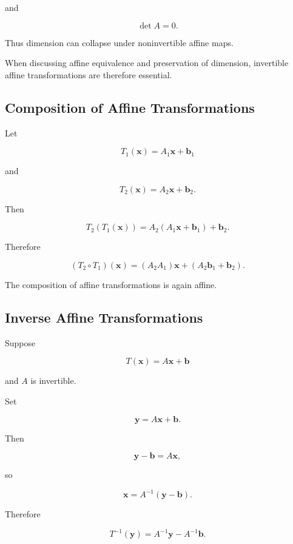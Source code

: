 and

\[ \det A=0. \]

Thus dimension can collapse under noninvertible affine maps.

When discussing affine equivalence and preservation of dimension, invertible
affine transformations are therefore essential.

\subsection{Composition of Affine Transformations}
\label{subsec:composition-affine-transformations}

Let

\[
T_1(\mathbf{x})=A_1\mathbf{x}+\mathbf{b}_1
\]

and

\[
T_2(\mathbf{x})=A_2\mathbf{x}+\mathbf{b}_2.
\]

Then

\[
T_2(T_1(\mathbf{x}))
=
A_2(A_1\mathbf{x}+\mathbf{b}_1)+\mathbf{b}_2.
\]

Therefore

\[
\boxed{
(T_2\circ T_1)(\mathbf{x})
=
(A_2A_1)\mathbf{x}
+
(A_2\mathbf{b}_1+\mathbf{b}_2).
}
\]

The composition of affine transformations is again affine.

\subsection{Inverse Affine Transformations}
\label{subsec:inverse-affine-transformations}

Suppose

\[ T(\mathbf{x})=A\mathbf{x}+\mathbf{b} \]

and \(A\) is invertible.

Set

\[ \mathbf{y}=A\mathbf{x}+\mathbf{b}. \]

Then

\[ \mathbf{y}-\mathbf{b}=A\mathbf{x}, \]

so

\[ \mathbf{x}=A^{-1}(\mathbf{y}-\mathbf{b}). \]

Therefore

\[
\boxed{
T^{-1}(\mathbf{y})
=
A^{-1}\mathbf{y}
-
A^{-1}\mathbf{b}.
}
\]

